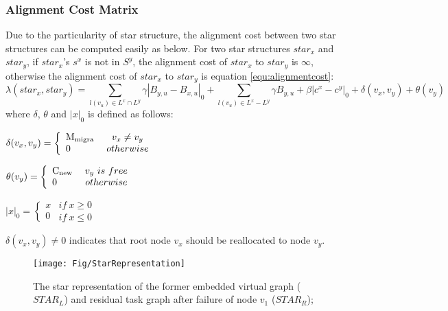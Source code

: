 \subsubsection{Alignment Cost Matrix}


Due to the particularity of star structure, the alignment cost between two star structures can be computed easily as below. For two star structures $star_x$ and $star_y$, if $star_x$'s $s^x$ is not in $S^y$, the alignment cost of $star_x$ to $star_y$ is $\infty$, otherwise the alignment cost of $star_x$ to $star_y$ is equation \ref{equ:alignmentcost}:
\begin{equation}\label{equ:alignmentcost}
\lambda(star_x,star_y)=\sum\limits_{l(v_u)\in L^x \cap L^y}\gamma|B_{y,u}-B_{x,u}|_0+\sum\limits_{l(v_u)\in L^x - L^y}\gamma B_{y,u}+\beta|c^x-c^y|_0+ \delta(v_x,v_y)+\theta(v_y)
\end{equation}
where $\delta$, $\theta$ and $|x|_0$ is defined as follows:

$\delta ({v_x},{v_y}) = \left\{ \begin{array}{l}
{\rm{M_{migra}}}\\
0
\end{array} \right.\begin{array}{*{20}{c}}
v_x\neq v_y\\
{otherwise}
\end{array}$

$\theta ({v_y}) = \left\{ \begin{array}{l}
{\rm{C_{new}}}\\
0
\end{array} \right.\begin{array}{*{20}{c}}
v_y\ is\ free\\
{otherwise}
\end{array}$

$|x|_0 = \left\{ \begin{array}{l}
{x}\\
0
\end{array} \right.\begin{array}{*{20}{c}}
if\ x\geq 0\\
{if\ x\leq 0}
\end{array}$

$\delta(v_x,v_y)\neq 0$ indicates that  root node $v_x$ should be reallocated to node $v_y$.
\begin{figure}
\centering
\texttt{[image: Fig/StarRepresentation]}\\
  \caption{The star representation of the former embedded virtual graph ($STAR_L$) and residual task graph after failure of node $v_1$ ($STAR_R$);}\label{fig:StarRepresentation}
\end{figure}

